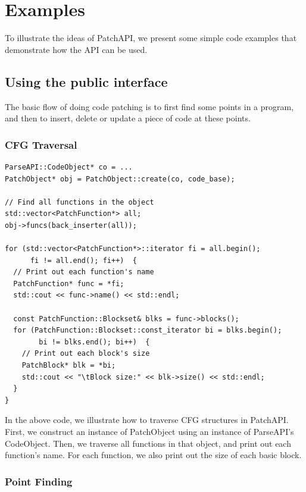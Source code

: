 \section{Examples}
\label{sec:examples}
To illustrate the ideas of PatchAPI, we present some simple code examples that
demonstrate how the API can be used.

\subsection{Using the public interface}
The basic flow of doing code patching is to first find some points in a program,
and then to insert, delete or update a piece of code at these points.
\subsubsection{CFG Traversal}
\begin{lstlisting}[caption=Example of CFG traversal]
ParseAPI::CodeObject* co = ...
PatchObject* obj = PatchObject::create(co, code_base);

// Find all functions in the object
std::vector<PatchFunction*> all;
obj->funcs(back_inserter(all));

for (std::vector<PatchFunction*>::iterator fi = all.begin();
      fi != all.end(); fi++)  {
  // Print out each function's name
  PatchFunction* func = *fi;
  std::cout << func->name() << std::endl;

  const PatchFunction::Blockset& blks = func->blocks();
  for (PatchFunction::Blockset::const_iterator bi = blks.begin();
        bi != blks.end(); bi++)  {
    // Print out each block's size
    PatchBlock* blk = *bi;
    std::cout << "\tBlock size:" << blk->size() << std::endl;
  }
}
\end{lstlisting}
In the above code, we illustrate how to traverse CFG structures in
PatchAPI. First, we construct an instance of PatchObject using an instance of
ParseAPI's CodeObject. Then, we traverse all functions in that object, and print
out each function's name. For each function, we also print out the size of each
basic block.

\subsubsection{Point Finding}
\label{sec:example-point-finding}


